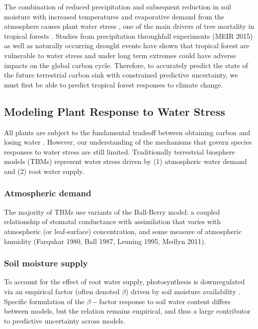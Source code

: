 \documentclass[10pt]{article}
\begin{document}
The combination of reduced precipitation and subsequent reduction in soil moisture with increased temperatures and evaporative demand from the atmosphere causes plant water stress \citep{choat_2018}, one of the main drivers of tree mortality in tropical forests \citep{rowland_2015,mcdowell_2018}. Studies from precipitation throughfall experiments \citep{nepstad_2007} (MEIR 2015) as well as  naturally occurring drought events \citep{lewis_2011,phillips_2009} have shown that tropical forest are vulnerable to water stress and under long term extremes could have adverse impacts on the global carbon cycle. Therefore, to accurately predict the state of the future terrestrial carbon sink with constrained predictive uncertainty, we must first be able to predict tropical forest responses to climate change.

\subsection*{Modeling Plant Response to Water Stress}

All plants are subject to the fundamental tradeoff between obtaining carbon and losing water \citep{bonan_2014}. However, our understanding of the mechanisms that govern species responses to water stress are still limited. Traditionally terrestrial biosphere models (TBMs) represent water stress driven by (1) atmospheric water demand and (2) root water supply.

\subsubsection*{Atmospheric demand}

The majority of TBMs use variants of the Ball-Berry model: a coupled relationship of stomatal conductance with  assimilation that varies with atmospheric (or leaf-surface)  concentration, and some measure of atmospheric humidity (Farquhar 1980, Ball 1987, Leuning 1995, Medlyn 2011). 

\subsubsection*{Soil moisture supply}

To account for the effect of root water supply, photosynthesis is downregulated via an empirical factor (often denoted $\beta$) driven by soil moisture availability \citep{rogers_2017}. Specific formulation of the $\beta-$factor response to soil water content differs between models, but the relation remains empirical, and thus a large contributor to predictive uncertainty across models.
 
\end{document}
